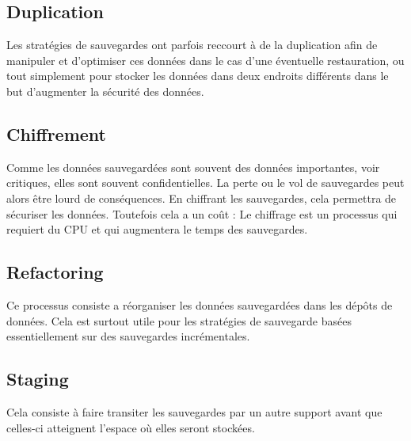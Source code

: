 \documentclass[a4paper,11pt]{report}
\begin{document}
\subsection{Duplication}
Les stratégies de sauvegardes ont parfois reccourt à de la duplication afin de manipuler et d'optimiser ces données dans le cas d'une éventuelle restauration, ou tout simplement pour stocker les données dans deux endroits différents dans le but d'augmenter la sécurité des données.

\subsection{Chiffrement}
Comme les données sauvegardées sont souvent des données importantes, voir critiques, elles sont souvent confidentielles.
La perte ou le vol de sauvegardes peut alors être lourd de conséquences.
En chiffrant les sauvegardes, cela permettra de sécuriser les données.
Toutefois cela a un coût : Le chiffrage est un processus qui requiert du CPU et qui augmentera le temps des sauvegardes.

\subsection{Refactoring}
Ce processus consiste a réorganiser les données sauvegardées dans les dépôts de données.
Cela est surtout utile pour les stratégies de sauvegarde basées essentiellement sur des sauvegardes incrémentales.

\subsection{Staging}
Cela consiste à faire transiter les sauvegardes par un autre support avant que celles-ci atteignent l'espace où elles seront stockées.

\begin{abstract}
\end{abstract}
\end{document}
